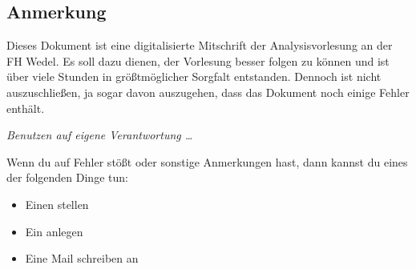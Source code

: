 \subsection*{Anmerkung}

Dieses Dokument ist eine digitalisierte Mitschrift der Analysisvorlesung an der FH Wedel. Es soll dazu dienen, der Vorlesung besser folgen zu können und ist über viele Stunden in größtmöglicher Sorgfalt entstanden. Dennoch ist nicht auszuschließen, ja sogar davon auszugehen, dass das Dokument noch einige Fehler enthält.

\bigskip
\textit{Benutzen auf eigene Verantwortung \ldots}
\bigskip

Wenn du auf Fehler stößt oder sonstige Anmerkungen hast, dann kannst du eines der folgenden Dinge tun:
\begin{itemize}
    \item Einen  stellen
    \item Ein  anlegen
    \item Eine Mail schreiben an 
\end{itemize}
